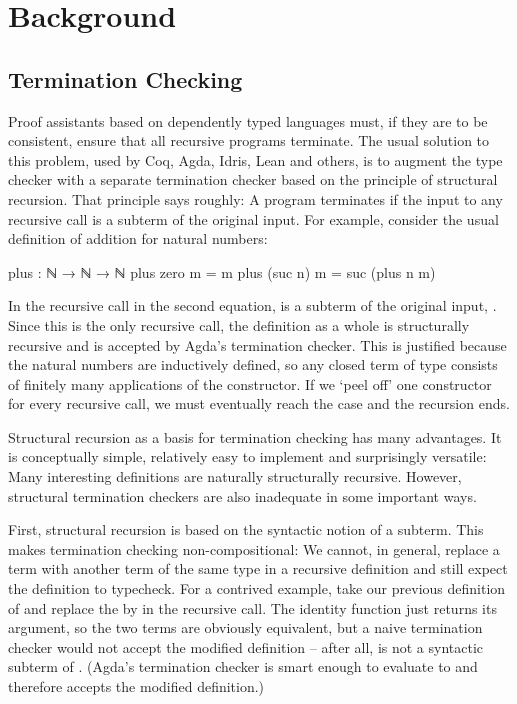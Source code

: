 \chapter{Background}
\label{sec:background}


\section{Termination Checking}
\label{sec:background:termination}

Proof assistants based on dependently typed languages must, if they are to be
consistent, ensure that all recursive programs terminate. The usual solution to
this problem, used by Coq, Agda, Idris, Lean and others, is to augment the type
checker with a separate termination checker based on the principle of structural
recursion. That principle says roughly: A program terminates if the input to any
recursive call is a subterm of the original input. For example, consider the
usual definition of addition for natural numbers:
\begin{code}
  plus : ℕ → ℕ → ℕ
  plus zero    m = m
  plus (suc n) m = suc (plus n m)
\end{code}

In the recursive call in the second equation,  is a subterm of the
original input, . Since this is the only recursive call, the
definition as a whole is structurally recursive and is accepted by Agda's
termination checker. This is justified because the natural numbers are
inductively defined, so any closed term of type  consists of finitely
many applications of the  constructor. If we \enquote*{peel off} one
constructor for every recursive call, we must eventually reach the 
case and the recursion ends.

Structural recursion as a basis for termination checking has many advantages. It
is conceptually simple, relatively easy to implement and surprisingly versatile:
Many interesting definitions are naturally structurally recursive. However,
structural termination checkers are also inadequate in some important ways.

First, structural recursion is based on the syntactic notion of a subterm. This
makes termination checking non-compositional: We cannot, in general, replace a
term with another term of the same type in a recursive definition and still
expect the definition to typecheck. For a contrived example, take our previous
definition of  and replace the  by  in the
recursive call. The identity function  just returns its argument, so
the two terms are obviously equivalent, but a naive termination checker would
not accept the modified definition -- after all,  is not a syntactic
subterm of . (Agda's termination checker is smart enough to
evaluate  to  and therefore accepts the modified
definition.)

